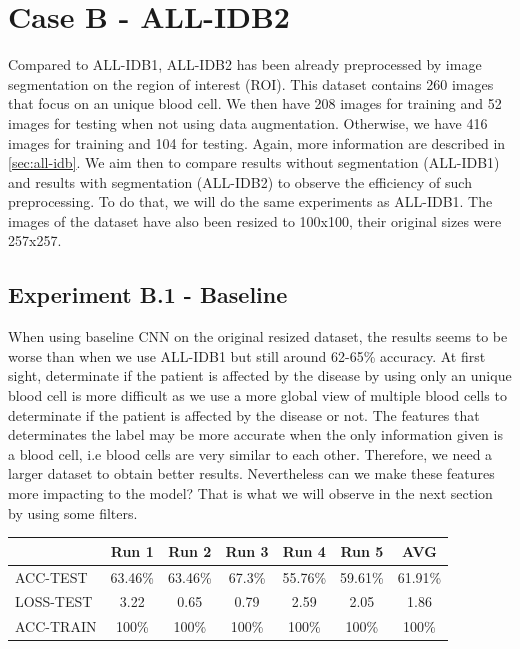 \documentclass[11pt, openany]{report}
\theoremstyle{plain}
\theoremstyle{definition}
\theoremstyle{remark}
\begin{document}

\section{Case B - ALL-IDB2} \label{sec:appendix-case-B}

Compared to ALL-IDB1, ALL-IDB2 has been already preprocessed by image segmentation on the region of interest (ROI). This dataset contains 260 images that focus on an unique blood cell. We then have 208 images for training and 52 images for testing when not using data augmentation. Otherwise, we have 416 images for training and 104 for testing. Again, more information are described in \autoref{sec:all-idb}. We aim then to compare results without segmentation (ALL-IDB1) and results with segmentation (ALL-IDB2) to observe the efficiency of such preprocessing. To do that, we will do the same experiments as ALL-IDB1. The images of the dataset have also been resized to 100x100, their original sizes were 257x257.

\subsection{Experiment B.1 - Baseline}
When using baseline CNN on the original resized dataset, the results seems to be worse than when we use ALL-IDB1 but still around 62-65\% accuracy. At first sight, determinate if the patient is affected by the disease by using only an unique blood cell is more difficult as we use a more global view of multiple blood cells to determinate if the patient is affected by the disease or not. The features that determinates the label may be more accurate when the only information given is a blood cell, i.e blood cells are very similar to each other. Therefore, we need a larger dataset to obtain better results. Nevertheless can we make these features more impacting to the model? That is what we will observe in the next section by using some filters.  

\begin{center}
\begin{tabular}{|l|c|c|c|c|c|c|}
  \hline
   & \textbf{Run 1} & \textbf{Run 2} & \textbf{Run 3} & \textbf{Run 4} & \textbf{Run 5} & \textbf{AVG}\\
  \hline
  ACC-TEST & 63.46\% & 63.46\% & 67.3\% & 55.76\% & 59.61\% & 61.91\% \\
  LOSS-TEST & 3.22 & 0.65 & 0.79 & 2.59  & 2.05 & 1.86 \\ 
  ACC-TRAIN & 100\% & 100\% & 100\% & 100\% & 100\% & 100\% \\ 
  \hline
\end{tabular}
\label{table:results-B1}
\end{center}
\end{document}
